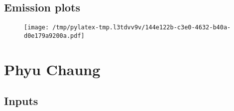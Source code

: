 \documentclass{article}%
\begin{document}
\subsection{Emission plots}%
\label{subsec:Emissionplots}%


\begin{figure}[htbp]%
\centering%
\texttt{[image: /tmp/pylatex-tmp.l3tdvv9v/144e122b-c3e0-4632-b40a-d0e179a9200a.pdf]}%
\end{figure}

%
\section{Phyu Chaung}%
\label{sec:PhyuChaung}%
\subsection{Inputs}%
\label{subsec:Inputs}%
\end{document}
